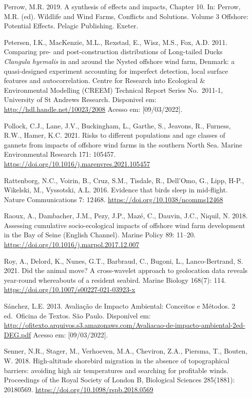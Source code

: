 \documentclass[
  oneside]{scrbook}
\begin{document}
Perrow, M.R. 2019. A synthesis of effects and impacts, Chapter 10. In: Perrow, M.R. (ed). Wildlife and Wind Farms, Conflicts and Solutions. Volume 3 Offshore: Potential Effects. Pelagic Publishing. Exeter.

Petersen, I.K., MacKenzie, M.L., Rexstad, E., Wisz, M.S., Fox, A.D. 2011. Comparing pre- and post-construction distributions of Long-tailed Ducks \emph{Clangula hyemalis} in and around the Nysted offshore wind farm, Denmark: a quasi-designed experiment accounting for imperfect detection, local surface features and autocorrelation. Centre for Research into Ecological \& Environmental Modelling (CREEM) Technical Report Series No.~2011-1, University of St Andrews Research. Disponivel em: \url{http://hdl.handle.net/10023/2008} Acesso em: {[}09/03/2022{]}.

Pollock, C.J., Lane, J.V., Buckingham, L., Garthe, S., Jeavons, R., Furness, R.W., Hamer, K.C. 2021. Risks to different populations and age classes of gannets from impacts of offshore wind farms in the southern North Sea. Marine Environmental Research 171: 105457. \url{https://doi.org/10.1016/j.marenvres.2021.105457}

Rattenborg, N.C., Voirin, B., Cruz, S.M., Tisdale, R., Dell'Omo, G., Lipp, H-P., Wikelski, M., Vyssotski, A.L. 2016. Evidence that birds sleep in mid-flight. Nature Communications 7: 12468. \url{https://doi.org/10.1038/ncomms12468}

Raoux, A., Dambacher, J.M., Pezy, J.P., Mazé, C., Dauvin, J.C., Niquil, N. 2018. Assessing cumulative socio-ecological impacts of offshore wind farm development in the Bay of Seine (English Channel). Marine Policy 89: 11--20. \url{https://doi.org/10.1016/j.marpol.2017.12.007}

Roy, A., Delord, K., Nunes, G.T., Barbraud, C., Bugoni, L., Lanco-Bertrand, S. 2021. Did the animal move? A cross-wavelet approach to geolocation data reveals year-round whereabouts of a resident seabird. Marine Biology 168(7): 114. \url{https://doi.org/10.1007/s00227-021-03923-x}

Sánchez, L.E. 2013. Avaliação de Impacto Ambiental: Conceitos e Métodos. 2 ed.~Oficina de Textos. São Paulo. Disponível em: \url{http://ofitexto.arquivos.s3.amazonaws.com/Avaliacao-de-impacto-ambiental-2ed-DEG.pdf} Acesso em: {[}09/03/2022{]}.

Senner, N.R., Stager, M., Verhoeven, M.A., Cheviron, Z.A., Piersma, T., Bouten, W. 2018. High-altitude shorebird migration in the absence of topographical barriers: avoiding high air temperatures and searching for profitable winds. Proceedings of the Royal Society of London B, Biological Sciences 285(1881): 20180569. \url{https://doi.org/10.1098/rspb.2018.0569}
\end{document}
